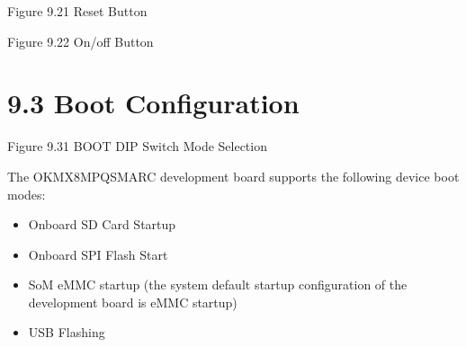 \documentclass[letterpaper,10pt,openany,english]{sphinxmanual}
\begin{document}
\sphinxAtStartPar
{}

\sphinxAtStartPar
Figure 9.2\sphinxhyphen{}1 Reset Button

\sphinxAtStartPar
{}

\sphinxAtStartPar
Figure 9.2\sphinxhyphen{}2 On/off Button

\sphinxAtStartPar
{}


\section{9.3 Boot Configuration}
\label{\detokenize{hardware:id26}}
\sphinxAtStartPar
{}

\sphinxAtStartPar
Figure 9.3\sphinxhyphen{}1 BOOT DIP Switch Mode Selection

\sphinxAtStartPar
The OK\sphinxhyphen{}MX8MPQ\sphinxhyphen{}SMARC development board supports the following device boot modes:
\begin{itemize}
\item {} 
\sphinxAtStartPar
Onboard SD Card Startup

\item {} 
\sphinxAtStartPar
Onboard SPI Flash Start

\item {} 
\sphinxAtStartPar
SoM eMMC startup (the system default startup configuration of the development board is eMMC startup)

\item {} 
\sphinxAtStartPar
USB Flashing

\end{itemize}

\sphinxAtStartPar
{}\\
\end{document}
